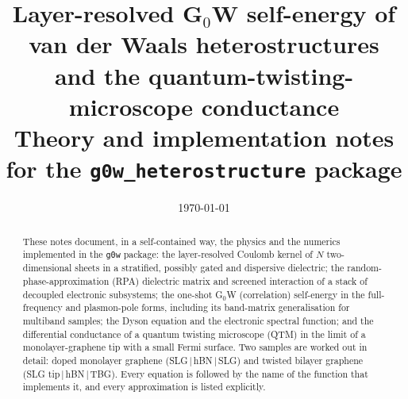 \documentclass[11pt,a4paper]{article}
\title{\textbf{Layer-resolved G$_0$W self-energy of van der Waals heterostructures\\ and the quantum-twisting-microscope conductance}\\[4pt]
\large Theory and implementation notes for the \texttt{g0w\_heterostructure} package}
\author{}
\date{\today}
\theoremstyle{remark}
\begin{document}
\maketitle

\begin{abstract}
These notes document, in a self-contained way, the physics and the numerics implemented in the
\texttt{g0w} package: the layer-resolved Coulomb kernel of $N$ two-dimensional sheets in a stratified,
possibly gated and dispersive dielectric; the random-phase-approximation (RPA) dielectric matrix and
screened interaction of a stack of decoupled electronic subsystems; the one-shot G$_0$W
(correlation) self-energy in the full-frequency and plasmon-pole forms, including its band-matrix
generalisation for multiband samples; the Dyson equation and the electronic spectral function; and the
differential conductance of a quantum twisting microscope (QTM) in the limit of a monolayer-graphene tip
with a small Fermi surface. Two samples are worked out in detail: doped monolayer graphene
(SLG\,$|$\,hBN\,$|$\,SLG) and twisted bilayer graphene (SLG tip\,$|$\,hBN\,$|$\,TBG). Every equation is
followed by the name of the function that implements it, and every approximation is listed explicitly.
\end{abstract}

\tableofcontents
\newpage











\appendix

\end{document}
